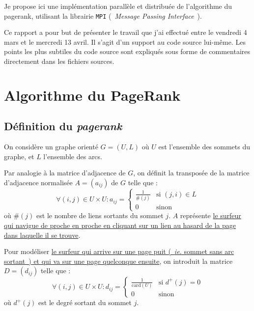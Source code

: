 \documentclass[a4paper,12pt]{article}
\begin{document}
Je propose ici une implémentation parallèle et distribuée de l'algorithme du pagerank, utilisant la librairie \texttt{MPI} (~\textit{Message Passing Interface}~).

\bigskip

Ce rapport a pour but de présenter le travail que j'ai effectué entre le vendredi 4 mars et le mercredi 13 avril. Il s'agit d'un support au code source lui-même. Les points les plus subtiles du code source sont expliqués sous forme de commentaires directement dans les fichiers sources.

\newpage

\section{Algorithme du PageRank}

\subsection{Définition du \textit{pagerank}}

On considère un graphe orienté $G = (U, L)$ où $U$ est l'ensemble des sommets du graphe, et $L$ l'ensemble des arcs.  

\bigskip

Par analogie à la matrice d'adjacence de $G$, on définit la transposée de la matrice d'adjacence normalisée $A = (a_{ij})$ de $G$ telle que :
$$
\forall (i,j) \in U \times U : a_{ij} = \left\{
\begin{array}{ll}
  \frac{1}{\#(j)} & \text{si } (j,i) \in L \\
  0 & \text{sinon}
\end{array}
\right.
$$  
où $\#(j)$ est le nombre de liens sortants du sommet $j$.
$A$ représente \ul{le surfeur qui navigue de proche en proche en cliquant sur un lien au hasard de la page dans laquelle il se trouve}.

\bigskip

Pour modéliser \ul{le surfeur qui arrive sur une page puit (~\textit{ie.} sommet sans arc sortant~) et qui va sur une page quelconque ensuite}, on introduit la matrice $D = (d_{ij})$ telle que :
$$
\forall (i,j) \in U \times U : d_{ij} = \left\{
\begin{array}{ll}
  \frac{1}{\text{card}(U)} & \text{si } d^+(j) = 0 \\
  0 & \text{sinon}
\end{array}
\right.
$$
où $d^+(j)$ est le degré sortant du sommet $j$.

\bigskip
\end{document}
